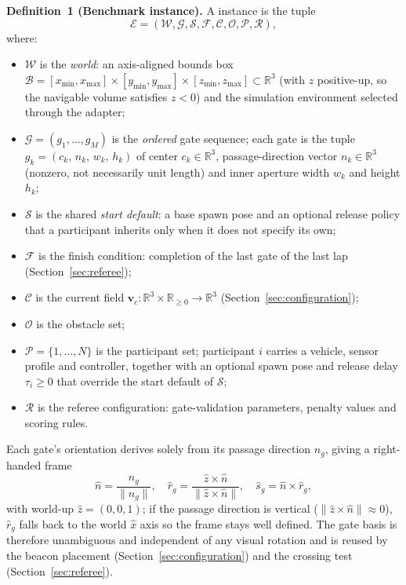 \noindent\textbf{Definition~1 (Benchmark instance).} A \mra{} instance is the tuple
\begin{equation}
\label{eq:instance}
\mathcal{E} = (\mathcal{W}, \mathcal{G}, \mathcal{S}, \mathcal{F}, \mathcal{C}, \mathcal{O}, \mathcal{P}, \mathcal{R}),
\end{equation}
where:
\begin{itemize}
 \item $\mathcal{W}$ is the \emph{world}: an axis-aligned bounds box $\mathcal{B}=[x_{\min},x_{\max}]\times[y_{\min},y_{\max}]\times[z_{\min},z_{\max}]\subset\mathbb{R}^3$ (with $z$ positive-up, so the navigable volume satisfies $z<0$) and the simulation environment selected through the adapter;
 \item $\mathcal{G}=(g_1,\dots,g_M)$ is the \emph{ordered} gate sequence; each gate is the tuple $g_k=(c_k,\,n_k,\,w_k,\,h_k)$ of center $c_k\in\mathbb{R}^3$, passage-direction vector $n_k\in\mathbb{R}^3$ (nonzero, not necessarily unit length) and inner aperture width $w_k$ and height $h_k$;
 \item $\mathcal{S}$ is the shared \emph{start default}: a base spawn pose and an optional release policy that a participant inherits only when it does not specify its own;
 \item $\mathcal{F}$ is the finish condition: completion of the last gate of the last lap (Section~\ref{sec:referee});
 \item $\mathcal{C}$ is the current field $\mathbf{v}_c:\mathbb{R}^3\times\mathbb{R}_{\ge0}\to\mathbb{R}^3$ (Section~\ref{sec:configuration});
 \item $\mathcal{O}$ is the obstacle set;
 \item $\mathcal{P}=\{1,\dots,N\}$ is the participant set; participant $i$ carries a vehicle, sensor profile and controller, together with an optional spawn pose and release delay $\tau_i\!\ge\!0$ that override the start default of $\mathcal{S}$;
 \item $\mathcal{R}$ is the referee configuration: gate-validation parameters, penalty values and scoring rules.
\end{itemize}
Each gate's orientation derives solely from its passage direction $n_g$, giving a right-handed frame
\begin{equation}
\label{eq:gate_frame}
\hat{n}=\frac{n_g}{\lVert n_g\rVert},\quad \hat{r}_g=\frac{\hat{z}\times\hat{n}}{\lVert\hat{z}\times\hat{n}\rVert},\quad \hat{s}_g=\hat{n}\times\hat{r}_g,
\end{equation}
with world-up $\hat{z}=(0,0,1)$; if the passage direction is vertical ($\lVert\hat{z}\times\hat{n}\rVert\!\approx\!0$), $\hat{r}_g$ falls back to the world $\hat{x}$ axis so the frame stays well defined. The gate basis is therefore unambiguous and independent of any visual rotation and is reused by the beacon placement (Section~\ref{sec:configuration}) and the crossing test (Section~\ref{sec:referee}).

